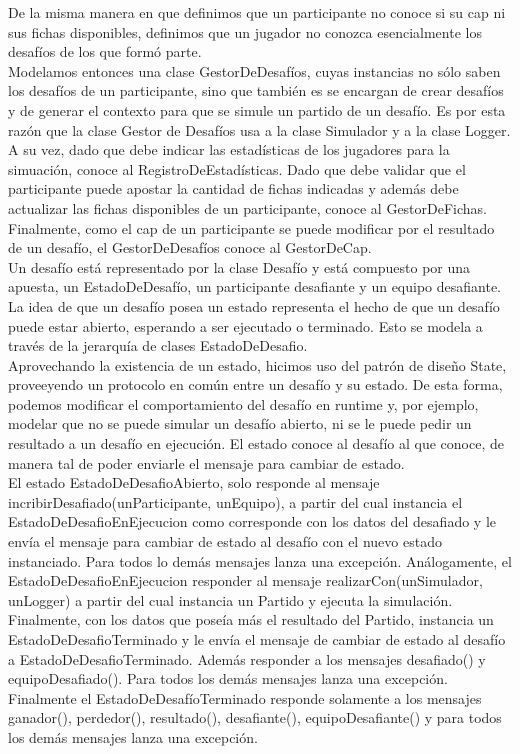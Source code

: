 De la misma manera en que definimos que un participante no conoce si su cap ni sus fichas disponibles, definimos que un jugador no conozca esencialmente los desafíos de los que formó parte.\\
Modelamos entonces una clase GestorDeDesafíos, cuyas instancias no sólo saben los desafíos de un participante, sino que también es se encargan de crear desafíos y de generar el contexto para que se simule un partido de un desafío. Es por esta razón que la clase Gestor de Desafíos usa a la clase Simulador y a la clase Logger.
A su vez, dado que debe indicar las estadísticas de los jugadores para la simuación, conoce al RegistroDeEstadísticas. Dado que debe validar que el participante puede apostar la cantidad de fichas indicadas y además debe actualizar las fichas disponibles de un participante, conoce al GestorDeFichas. Finalmente, como el cap de un participante se puede modificar por el resultado de un desafío, el GestorDeDesafíos conoce al GestorDeCap.\\

Un desafío está representado por la clase Desafío y está compuesto por una apuesta, un EstadoDeDesafío, un participante desafiante y un equipo desafiante.\\
La idea de que un desafío posea un estado representa el hecho de que un desafío puede estar abierto, esperando a ser ejecutado o terminado. Esto se modela a través de la jerarquía de clases EstadoDeDesafio.\\
Aprovechando la existencia de un estado, hicimos uso del patrón de diseño State, proveeyendo un protocolo en común entre un desafío y su estado. De esta forma, podemos modificar el comportamiento del desafío en runtime y, por ejemplo, modelar que no se puede simular un desafío abierto, ni se le puede pedir un resultado a un desafío en ejecución. El estado conoce al desafío al que conoce, de manera tal de poder enviarle el mensaje para cambiar de estado.\\
El estado EstadoDeDesafioAbierto, solo responde al mensaje incribirDesafiado(unParticipante, unEquipo), a partir del cual instancia el EstadoDeDesafioEnEjecucion como corresponde con los datos del desafiado y le envía el mensaje para cambiar de estado al desafío con el nuevo estado instanciado. Para todos lo demás mensajes lanza una excepción.
Análogamente, el EstadoDeDesafioEnEjecucion responder al mensaje realizarCon(unSimulador, unLogger) a partir del cual instancia un Partido y ejecuta la simulación. Finalmente, con los datos que poseía más el resultado del Partido, instancia un EstadoDeDesafioTerminado y le envía el mensaje de cambiar de estado al desafío a EstadoDeDesafioTerminado. Además responder a los mensajes desafiado() y equipoDesafiado(). Para todos los demás mensajes lanza una excepción.
Finalmente el EstadoDeDesafíoTerminado responde solamente a los mensajes ganador(), perdedor(), resultado(), desafiante(), equipoDesafiante() y para todos los demás mensajes lanza una excepción.

